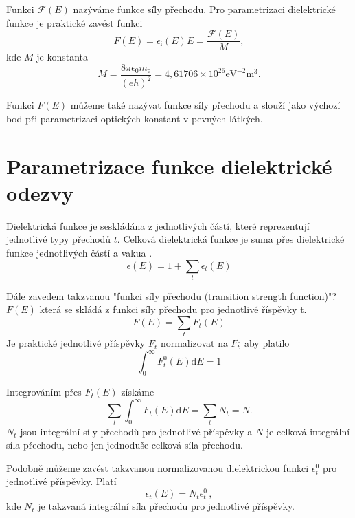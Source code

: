 Funkci $\mathcal{F}(E)$ nazýváme funkce síly přechodu. Pro parametrizaci dielektrické funkce je praktické zavést funkci
\begin{equation}
F(E) = \epsilon_\mathrm{i}(E) E = \frac{\mathcal{F}(E)}{M}\mathrm{,}
\end{equation}  
kde $M$ je konstanta
\begin{equation} 
M = \frac{8 \pi \epsilon_0 m_\mathrm{e}}{(e h)^2} = 4,61706\times10^{26} \mathrm{eV}^{-2}\mathrm{m}^3 \mathrm{.}
\end{equation}

Funkci $F(E)$ můžeme také nazývat funkce síly přechodu a slouží jako výchozí bod při parametrizaci optických konstant v pevných látkých.

\section{Parametrizace funkce dielektrické odezvy}
Dielektrická funkce je seskládána z jednotlivých částí, které reprezentují jednotlivé typy přechodů $t$. Celková dielektrická funkce je suma přes dielektrické funkce jednotlivých částí a vakua \cite{sumrule}. 
\begin{equation}
\epsilon(E) = 1 + \sum_t \epsilon_t(E)
\label{suma1}
\end{equation}

Dále zavedem takzvanou "funkci síly přechodu (transition strength function)"? $F(E)$ která se skládá z funkci síly přechodu pro jednotlivé říspěvky t.
\begin{equation}
F(E) = \sum_t F_t(E)
\end{equation}
Je praktické jednotlivé příspěvky $F_t$ normalizovat na $F_t^0$ aby platilo
\begin{equation}
\int_0^\infty F_t^0(E)\mathrm{d}E = 1
\end{equation}

Integrováním přes $F_t(E)$ získáme 
\begin{equation}
\label{definiceceelkovesily}
\sum_t \int_0^\infty F_t(E)\mathrm{d}E = \sum_t N_t = N \mathrm{.}
\end{equation}
$N_t$ jsou integrální síly přechodů pro jednotlivé příspěvky a $N$ je celková integrální síla přechodu, nebo jen jednoduše celková síla přechodu.  

Podobně můžeme zavést takzvanou normalizovanou dielektrickou funkci $\epsilon_t^0$ pro jednotlivé příspěvky. Platí 
\begin{equation}
\epsilon_t(E) = N_t \epsilon_t^0  \, \mathrm{,}
\end{equation}
kde $N_t$ je takzvaná integrální síla přechodu pro jednotlivé příspěvky.

